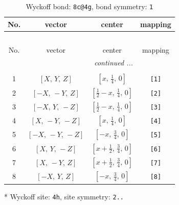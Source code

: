 \documentclass[fleqn,8pt]{jsarticle}
\begin{document}
\renewcommand{\arraystretch}{1.2}
\begin{longtable}{cccc}
\caption{Wyckoff bond: {\tt 8c@4g}, bond symmetry: {\tt 1}}
 \\
 \hline \hline
No. & vector & center & mapping \\ \hline \endfirsthead

\multicolumn{3}{l}{\tablename\ \thetable{}} \\
 \hline \hline
No. & vector & center & mapping \\ \hline \endhead

 \hline \hline
\multicolumn{3}{r}{\footnotesize\it continued ...} \\ \endfoot

 \hline \hline
\multicolumn{3}{r}{} \\ \endlastfoot

1 & $\left[ X,\, Y,\, Z \right]$ & $\left[ x,\, \frac{1}{4},\, 0 \right]$ & {\tt [1]} \\ \hline
2 & $\left[ - X,\, - Y,\, Z \right]$ & $\left[ \frac{1}{2} - x,\, \frac{1}{4},\, 0 \right]$ & {\tt [2]} \\ \hline
3 & $\left[ - X,\, Y,\, - Z \right]$ & $\left[ \frac{1}{2} - x,\, \frac{1}{4},\, 0 \right]$ & {\tt [3]} \\ \hline
4 & $\left[ X,\, - Y,\, - Z \right]$ & $\left[ x,\, \frac{1}{4},\, 0 \right]$ & {\tt [4]} \\ \hline
5 & $\left[ - X,\, - Y,\, - Z \right]$ & $\left[ - x,\, \frac{3}{4},\, 0 \right]$ & {\tt [5]} \\ \hline
6 & $\left[ X,\, Y,\, - Z \right]$ & $\left[ x + \frac{1}{2},\, \frac{3}{4},\, 0 \right]$ & {\tt [6]} \\ \hline
7 & $\left[ X,\, - Y,\, Z \right]$ & $\left[ x + \frac{1}{2},\, \frac{3}{4},\, 0 \right]$ & {\tt [7]} \\ \hline
8 & $\left[ - X,\, Y,\, Z \right]$ & $\left[ - x,\, \frac{3}{4},\, 0 \right]$ & {\tt [8]} \\
\end{longtable}
* Wyckoff site: {\tt 4h}, site symmetry: {\tt 2..}
\renewcommand{\arraystretch}{1.2}
\end{document}
